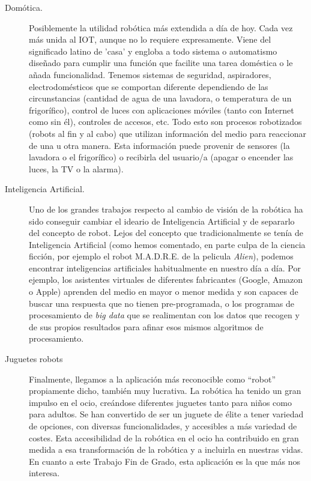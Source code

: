 \begin{description}
	\item [Domótica.] Posiblemente la utilidad robótica más extendida a día de hoy. Cada vez más unida al IOT, aunque no lo requiere expresamente. Viene del significado latino de 'casa' y engloba a todo sistema o automatismo diseñado para cumplir una función que facilite una tarea doméstica o le añada funcionalidad. Tenemos sistemas de seguridad, aspiradores, electrodomésticos que se comportan diferente dependiendo de las circunstancias (cantidad de agua de una lavadora, o temperatura de un frigorífico), control de luces con aplicaciones móviles (tanto con Internet como sin él), controles de accesos, etc. Todo esto son procesos robotizados (robots al fin y al cabo) que utilizan información del medio para reaccionar de una u otra manera. Esta información puede provenir de sensores (la lavadora o el frigorífico) o recibirla del usuario/a (apagar o encender las luces, la TV o la alarma).
	
	\item [Inteligencia Artificial.] Uno de los grandes trabajos respecto al cambio de visión de la robótica ha sido conseguir cambiar el ideario de Inteligencia Artificial y de separarlo del concepto de robot. Lejos del concepto que tradicionalmente se tenía de Inteligencia Artificial (como hemos comentado, en parte culpa de la ciencia ficción, por ejemplo el robot M.A.D.R.E. de la pelicula \textit{Alien}), podemos encontrar inteligencias artificiales habitualmente en nuestro día a día. Por ejemplo, los asistentes virtuales de diferentes fabricantes (Google, Amazon o Apple) aprenden del medio en mayor o menor medida y son capaces de buscar una respuesta que no tienen pre-programada, o los programas de procesamiento de \textit{big data} que se realimentan con los datos que recogen y de sus propios resultados para afinar esos mismos algoritmos de procesamiento.
	
	\item [Juguetes robots] Finalmente, llegamos a la aplicación más reconocible como ``robot'' propiamente dicho, también muy lucrativa. La robótica ha tenido un gran impulso en el ocio, creándose diferentes juguetes tanto para niños como para adultos. Se han convertido de ser un juguete de élite a tener variedad de opciones, con diversas funcionalidades, y accesibles a más variedad de costes. Esta accesibilidad de la robótica en el ocio ha contribuido en gran medida a esa transformación de la robótica y a incluirla en nuestras vidas. En cuanto a este Trabajo Fin de Grado, esta aplicación es la que más nos interesa.
\end{description}


